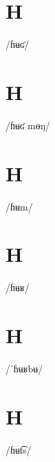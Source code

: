 \documentclass[10pt,a4paper,twoside]{book}
\begin{document}
\section*{H}

\begin{multicols}{3}
 {/ɦʉʛ/} {}
\end{multicols}

\section*{H}

\begin{multicols}{3}
 {/ɦʉʛ mɵŋ/} {}
\end{multicols}

\section*{H}

\begin{multicols}{3}
 {/ɦʉm/} {}
\end{multicols}

\section*{H}

\begin{multicols}{3}
 {/ɦʉʁ/} {}
\end{multicols}

\section*{H}

\begin{multicols}{3}
 {/ˈɦʉʁbʉ/} {}
\end{multicols}

\section*{H}

\begin{multicols}{3}
 {/ɦʉt͡s/} {}
\end{multicols}
\end{document}
